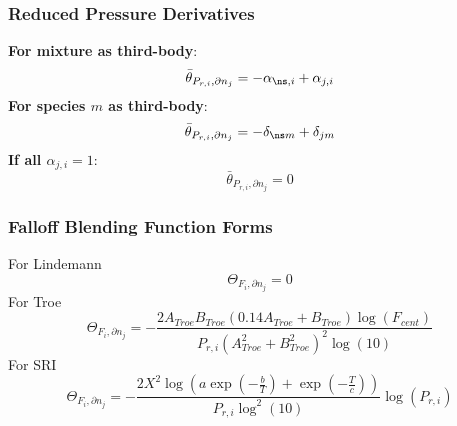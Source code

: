 \documentclass[a4paper,10pt]{article}
\begin{document}
\subsubsection{Reduced Pressure Derivatives}
\textbf{For mixture as third-body}:
\begin{dmath} \bar{\theta}_{P_{r, i}, \partial n_j} = - \alpha_{\ns,i} + \alpha_{j,i}\end{dmath} 
\textbf{For species $m$ as third-body}:
\begin{dmath} \bar{\theta}_{P_{r, i}, \partial n_j} = - \delta_{\ns m} + \delta_{j m}\end{dmath} 
\textbf{If all $\alpha_{j,i} = 1$}:
\begin{dmath} \bar{\theta}_{P_{r, i}, \partial n_j} = 0\end{dmath} 
\subsubsection{Falloff Blending Function Forms}
For Lindemann
\begin{dmath} \Theta_{F_i, \partial n_j} = 0\end{dmath} 
For Troe
\begin{dmath} \Theta_{F_i, \partial n_j} = - \frac{2 A_{Troe} B_{Troe} \left(0.14 A_{Troe} + B_{Troe}\right) \log{\left (F_{cent} \right )}}{P_{r, i} \left(A_{Troe}^{2} + B_{Troe}^{2}\right)^{2} \log{\left (10 \right )}}\end{dmath} 
For SRI
\begin{dmath} \Theta_{F_i, \partial n_j} = - \frac{2 X^{2} \log{\left (a \operatorname{exp}\left({- \frac{b}{T}}\right) + \operatorname{exp}\left({- \frac{T}{c}}\right) \right )}}{P_{r, i} \log^{2}{\left (10 \right )}} \log{\left (P_{r, i} \right )}\end{dmath} 
\end{document}
